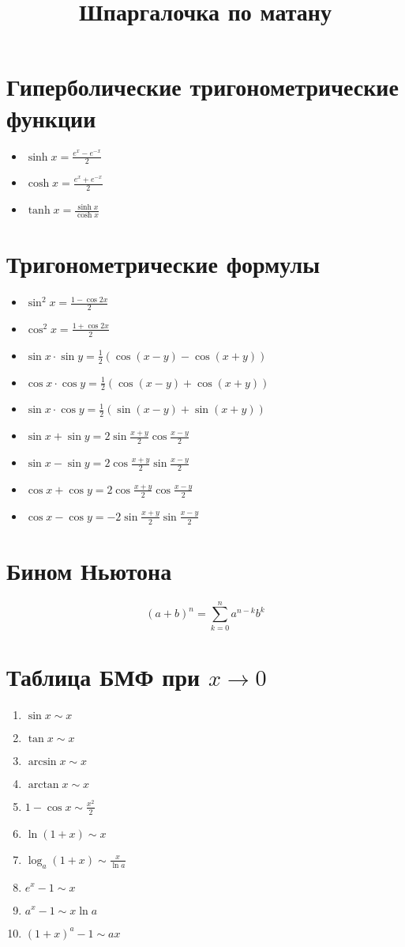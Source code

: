 \documentclass{article}
\begin{document}
   \title{Шпаргал\textbf{очка} по матану}
    \maketitle
    \section{Гиперболические тригонометрические функции}
    \begin{itemize}
	\item $\sinh x = \frac{e^x-e^{-x}}{2}$
	\item $\cosh x = \frac{e^x+e^{-x}}{2}$
	\item $\tanh x = \frac{\sinh x}{\cosh x}$
    \end{itemize}
	\section{Тригонометрические формулы}
	\begin{itemize}
		\item $\sin^2{x} = \frac{1-\cos{2x}}{2}$
		\item $\cos^2{x} = \frac{1+\cos{2x}}{2}$
		\item $\sin{x} \cdot \sin{y} = \frac{1}{2}(\cos(x-y) - \cos(x+y))$
		\item $\cos{x} \cdot \cos{y} = \frac{1}{2}(\cos(x-y) + \cos(x+y))$
		\item $\sin{x} \cdot \cos{y} = \frac{1}{2}(\sin(x-y) + \sin(x+y))$
		\item $\sin{x} + \sin{y} = 2\sin{\frac{x+y}{2}}\cos{\frac{x-y}{2}}$
		\item $\sin{x} - \sin{y} = 2\cos{\frac{x+y}{2}}\sin{\frac{x-y}{2}}$
		\item $\cos{x} + \cos{y} = 2\cos{\frac{x+y}{2}}\cos{\frac{x-y}{2}}$
		\item $\cos{x} - \cos{y} = -2\sin{\frac{x+y}{2}}\sin{\frac{x-y}{2}}$
	\end{itemize}
	
	\section{Бином Ньютона}
	$$ (a+b)^n = \sum_{k=0}^{n} a^{n-k}b^{k} $$
    \section{Таблица БМФ при $x \to 0 $}
    \begin{enumerate}
	\item $\sin x \sim x$
	\item $\tan{x} \sim x$
	\item $\arcsin x \sim x$
	\item $\arctan x \sim x$
	\item $1 - \cos{x} \sim \frac{x^2}{ 2}$
	\item $\ln{(1+x)} \sim x$
	\item $\log_a{(1+x)} \sim \frac{x}{\ln{a}}$
	\item $e^x -1 \sim x$
	\item $a^x-1 \sim x \ln{a}$
	\item $(1+x)^a-1 \sim ax$
    \end{enumerate}
\end{document}
